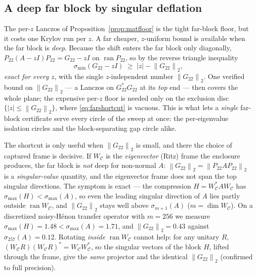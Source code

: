 \documentclass[11pt,a4paper]{article}
\newcommand{\norm}[1]{\left\|#1\right\|}
\newcommand{\abs}[1]{\left|#1\right|}
\theoremstyle{plain}
\theoremstyle{definition}
\begin{document}
\subsection*{A deep far block by singular deflation}\label{sec:deepfar}

The per-$z$ Lanczos of Proposition~\ref{prop:matfloor} is the tight far-block floor, but it
costs one Krylov run per $z$. A far cheaper, $z$-uniform bound is available when the far block
is \emph{deep}. Because the shift enters the far block only diagonally,
$P_{22}(A-zI)P_{22}=G_{22}-zI$ on $\operatorname{ran}P_{22}$, so by the reverse triangle inequality
\begin{equation}\label{eq:farshortcut}
  \sigma_{\min}(G_{22}-zI)\;\ge\;\abs{z}-\norm{G_{22}}_2 ,
\end{equation}
\emph{exact for every $z$}, with the single $z$-independent number $\norm{G_{22}}_2$. One verified
bound on $\norm{G_{22}}_2$ --- a Lanczos on $G_{22}^{*}G_{22}$ at its \emph{top} end --- then covers
the whole plane; the expensive per-$z$ floor is needed only on the exclusion disc
$\{\abs{z}\le\norm{G_{22}}_2\}$, where \eqref{eq:farshortcut} is vacuous. This is what lets a
\emph{single} far-block certificate serve every circle of the sweep at once: the per-eigenvalue
isolation circles and the block-separating gap circle alike.

The shortcut is only useful when $\norm{G_{22}}_2$ is small, and there the choice of captured
frame is decisive. If $W_{\mathcal C}$ is the \emph{eigenvector} (Ritz) frame the enclosure
produces, the far block is \emph{not} deep for non-normal $A$: $\norm{G_{22}}_2=\norm{P_{22}AP_{22}}_2$
is a \emph{singular-value} quantity, and the eigenvector frame does not span the top singular
directions. The symptom is exact --- the compression $H=W_{\mathcal C}^{*}AW_{\mathcal C}$ has
$\sigma_{\max}(H)<\sigma_{\max}(A)$, so even the leading singular direction of $A$ lies partly
outside $\operatorname{ran}W_{\mathcal C}$, and $\norm{G_{22}}_2$ stays well above $\sigma_{m+1}(A)$
($m=\dim W_{\mathcal C}$). On a discretized noisy-H\'enon transfer operator with $m=256$ we measure
$\sigma_{\max}(H)=1.48<\sigma_{\max}(A)=1.71$, and $\norm{G_{22}}_2=0.43$ against $\sigma_{257}(A)=0.12$.
Rotating \emph{inside} $\operatorname{ran}W_{\mathcal C}$ cannot help: for any unitary $R$,
$(W_{\mathcal C}R)(W_{\mathcal C}R)^{*}=W_{\mathcal C}W_{\mathcal C}^{*}$, so the singular vectors of
the block $H$, lifted through the frame, give the \emph{same} projector and the identical
$\norm{G_{22}}_2$ (confirmed to full precision).
\end{document}
